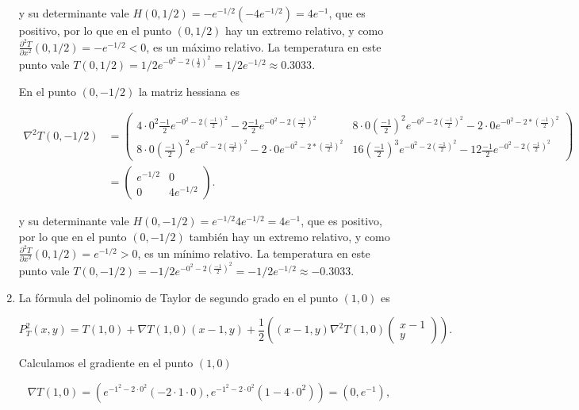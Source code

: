 \documentclass[
  spanish,
  a4paper,
]{scrreport}
\theoremstyle{definition}
\theoremstyle{remark}
\begin{document}
\begin{tcolorbox}
\begin{enumerate}
  y su determinante vale \(H(0,1/2) = -e^{-1/2}(-4e^{-1/2}) = 4e^{-1}\),
  que es positivo, por lo que en el punto \((0,1/2)\) hay un extremo
  relativo, y como
  \(\frac{\partial^2 T}{\partial x^2}(0,1/2) = -e^{-1/2} < 0\), es un
  máximo relativo. La temperatura en este punto vale
  \(T(0,1/2) = 1/2e^{-0^2 - 2\left(\frac{1}{2}\right)^2} = 1/2e^{-1/2} \approx 0.3033\).

  En el punto \((0,-1/2)\) la matriz hessiana es

  \begin{align*}
  \nabla^2T(0,-1/2)
  &= \begin{pmatrix}
  4\cdot 0^2\frac{-1}{2}e^{-0^2 - 2\left(\frac{-1}{2}\right)^2} - 2\frac{-1}{2}e^{-0^2 - 2\left(\frac{-1}{2}\right)^2} & 8\cdot 0\left(\frac{-1}{2}\right)^2e^{-0^2 - 2\left(\frac{-1}{2}\right)^2} - 2\cdot 0e^{-0^2 - 2*\left(\frac{-1}{2}\right)^2} \\
  8\cdot 0\left(\frac{-1}{2}\right)^2e^{-0^2 - 2\left(\frac{-1}{2}\right)^2} - 2\cdot 0e^{-0^2 - 2*\left(\frac{-1}{2}\right)^2} & 16\left(\frac{-1}{2}\right)^3e^{-0^2 - 2\left(\frac{-1}{2}\right)^2} - 12\frac{-1}{2}e^{-0^2 - 2\left(\frac{-1}{2}\right)^2} 
  \end{pmatrix}\\
  &= \begin{pmatrix}
  e^{-1/2} & 0 \\
  0 & 4e^{-1/2}
  \end{pmatrix}.
  \end{align*}

  y su determinante vale \(H(0,-1/2) = e^{-1/2}4e^{-1/2} = 4e^{-1}\),
  que es positivo, por lo que en el punto \((0,-1/2)\) también hay un
  extremo relativo, y como
  \(\frac{\partial^2 T}{\partial x^2}(0,1/2) = e^{-1/2} > 0\), es un
  mínimo relativo. La temperatura en este punto vale
  \(T(0,-1/2) = -1/2e^{-0^2 - 2\left(\frac{-1}{2}\right)^2} = -1/2e^{-1/2} \approx -0.3033\).
\item
  La fórmula del polinomio de Taylor de segundo grado en el punto
  \((1,0)\) es

  \[
  P_T^2(x,y) = T(1,0) + \nabla T(1,0) (x-1, y) + \frac{1}{2} \left((x-1,y)\nabla^2T(1,0)\begin{pmatrix}x-1 \\ y\end{pmatrix}\right).
  \]

  Calculamos el gradiente en el punto \((1,0)\)

  \[
  \nabla T(1,0) = \left(e^{-1^2-2\cdot 0^2}(-2\cdot 1\cdot 0), e^{-1^2-2\cdot 0^2}(1-4\cdot 0^2)\right) = (0,e^{-1}),
  \]


\end{enumerate}
\end{tcolorbox}
\end{document}
